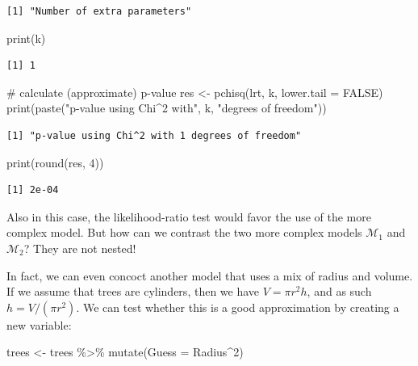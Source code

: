 \documentclass[
  letterpaper,
  DIV=11,
  numbers=noendperiod]{scrreprt}
\newenvironment{Shaded}{\begin{snugshade}}{\end{snugshade}}
\newcommand{\AttributeTok}[1]{\textcolor[rgb]{0.40,0.45,0.13}{#1}}
\newcommand{\CommentTok}[1]{\textcolor[rgb]{0.37,0.37,0.37}{#1}}
\newcommand{\ConstantTok}[1]{\textcolor[rgb]{0.56,0.35,0.01}{#1}}
\newcommand{\DecValTok}[1]{\textcolor[rgb]{0.68,0.00,0.00}{#1}}
\newcommand{\FunctionTok}[1]{\textcolor[rgb]{0.28,0.35,0.67}{#1}}
\newcommand{\NormalTok}[1]{\textcolor[rgb]{0.00,0.23,0.31}{#1}}
\newcommand{\OtherTok}[1]{\textcolor[rgb]{0.00,0.23,0.31}{#1}}
\newcommand{\SpecialCharTok}[1]{\textcolor[rgb]{0.37,0.37,0.37}{#1}}
\newcommand{\StringTok}[1]{\textcolor[rgb]{0.13,0.47,0.30}{#1}}
\begin{document}
\begin{verbatim}
[1] "Number of extra parameters"
\end{verbatim}

\begin{Shaded}
\begin{Highlighting}[]
\FunctionTok{print}\NormalTok{(k)}
\end{Highlighting}
\end{Shaded}

\begin{verbatim}
[1] 1
\end{verbatim}

\begin{Shaded}
\begin{Highlighting}[]
\CommentTok{\# calculate (approximate) p{-}value}
\NormalTok{res }\OtherTok{\textless{}{-}} \FunctionTok{pchisq}\NormalTok{(lrt, k, }\AttributeTok{lower.tail =} \ConstantTok{FALSE}\NormalTok{)}
\FunctionTok{print}\NormalTok{(}\FunctionTok{paste}\NormalTok{(}\StringTok{"p{-}value using Chi\^{}2 with"}\NormalTok{, k, }\StringTok{"degrees of freedom"}\NormalTok{))}
\end{Highlighting}
\end{Shaded}

\begin{verbatim}
[1] "p-value using Chi^2 with 1 degrees of freedom"
\end{verbatim}

\begin{Shaded}
\begin{Highlighting}[]
\FunctionTok{print}\NormalTok{(}\FunctionTok{round}\NormalTok{(res, }\DecValTok{4}\NormalTok{))}
\end{Highlighting}
\end{Shaded}

\begin{verbatim}
[1] 2e-04
\end{verbatim}

Also in this case, the likelihood-ratio test would favor the use of the
more complex model. But how can we contrast the two more complex models
\(\mathcal M_1\) and \(\mathcal M_2\)? They are not nested!

In fact, we can even concoct another model that uses a mix of radius and
volume. If we assume that trees are cylinders, then we have
\(V = \pi r^2 h\), and as such \(h = V / (\pi r^2)\). We can test
whether this is a good approximation by creating a new variable:

\begin{Shaded}
\begin{Highlighting}[]
\NormalTok{trees }\OtherTok{\textless{}{-}}\NormalTok{ trees }\SpecialCharTok{\%\textgreater{}\%} \FunctionTok{mutate}\NormalTok{(}\AttributeTok{Guess =}\NormalTok{ Radius}\SpecialCharTok{\^{}}\DecValTok{2}\NormalTok{)}
\end{Highlighting}
\end{Shaded}
\end{document}
